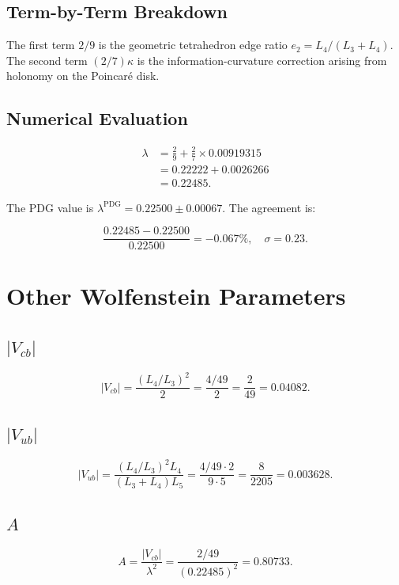 \subsection{Term-by-Term Breakdown}

The first term \(2/9\) is the geometric tetrahedron edge ratio
\(e_2 = L_4/(L_3+L_4)\).  The second term \((2/7)\kappa\) is the
information-curvature correction arising from holonomy on the
Poincar\'{e} disk.

\subsection{Numerical Evaluation}

\[
\begin{aligned}
\lambda &= \frac{2}{9} + \frac{2}{7} \times 0.00919315 \\
        &= 0.22222 + 0.0026266 \\
        &= 0.22485.
\end{aligned}
\]

The PDG value is \(\lambda^{\text{PDG}} = 0.22500 \pm 0.00067\).
The agreement is:

\[
\frac{0.22485 - 0.22500}{0.22500} = -0.067\%,\quad \sigma = 0.23.
\]

\section{Other Wolfenstein Parameters}

\subsection{\(|V_{cb}|\)}

\[
|V_{cb}| = \frac{(L_4/L_3)^2}{2} = \frac{4/49}{2} = \frac{2}{49} = 0.04082.
\]

\subsection{\(|V_{ub}|\)}

\[
|V_{ub}| = \frac{(L_4/L_3)^2 L_4}{(L_3+L_4)L_5}
         = \frac{4/49 \cdot 2}{9 \cdot 5}
         = \frac{8}{2205}
         = 0.003628.
\]

\subsection{\(A\)}

\[
A = \frac{|V_{cb}|}{\lambda^2}
  = \frac{2/49}{(0.22485)^2}
  = 0.80733.
\]

